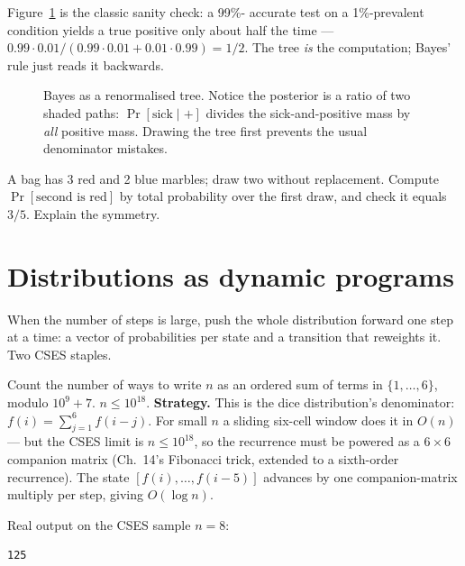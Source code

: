 Figure~\ref{fig:bayes} is the classic sanity check: a 99\%-
accurate test on a 1\%-prevalent condition yields a true
positive only about half the time --- $0.99\cdot0.01/(0.99\cdot0.01+0.01\cdot0.99)=1/2$.
The tree \emph{is} the computation; Bayes' rule just reads it
backwards.
\begin{figure}[ht]\centering

\caption{Bayes as a renormalised tree. Notice the posterior is
a ratio of two shaded paths: $\Pr[\text{sick}\mid +]$ divides
the sick-and-positive mass by \emph{all} positive mass. Drawing
the tree first prevents the usual denominator mistakes.}
\label{fig:bayes}
\end{figure}

\begin{exercise}[easy] A bag has 3 red and 2 blue marbles; draw
two without replacement. Compute $\Pr[\text{second is red}]$
by total probability over the first draw, and check it equals
$3/5$. Explain the symmetry.\end{exercise}

\section{Distributions as dynamic programs}\label{sec:probdp}
When the number of steps is large, push the whole distribution
forward one step at a time: a vector of probabilities per state
and a transition that reweights it. Two CSES staples.

\begin{example}
Count the number of ways to write $n$ as an ordered sum of
terms in $\{1,\dots,6\}$, modulo $10^9+7$. $n\le 10^{18}$.
\textbf{Strategy.} This is the dice distribution's
denominator: $f(i)=\sum_{j=1}^{6}f(i-j)$. For small $n$ a
sliding six-cell window does it in $O(n)$ --- but the CSES
limit is $n\le 10^{18}$, so the recurrence must be powered as
a $6\times6$ companion matrix (Ch.~14's Fibonacci trick,
extended to a sixth-order recurrence). The state
$[f(i),\dots,f(i-5)]$ advances by one companion-matrix multiply
per step, giving $O(\log n)$.
\end{example}
\begin{solution}

Real output on the CSES sample $n=8$:
\begin{verbatim}
125
\end{verbatim}
\end{solution}

